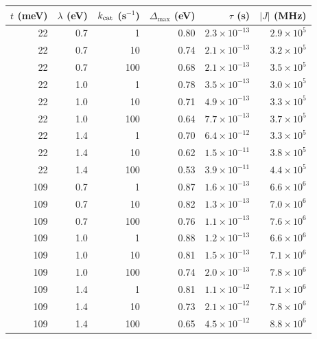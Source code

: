 \begin{tabular}{rrrrrr}
\toprule
$t$ (meV) & $\lambda$ (eV) & $k_{\rm cat}$ (s$^{-1}$) & $\Delta_{\max}$ (eV) & $\tau$ (s) & $|J|$ (MHz) \\
\midrule
22 & 0.7 & 1 & 0.80 & $\ensuremath{2.3\times10^{-13}}$ & $\ensuremath{2.9\times10^{5}}$ \\
22 & 0.7 & 10 & 0.74 & $\ensuremath{2.1\times10^{-13}}$ & $\ensuremath{3.2\times10^{5}}$ \\
22 & 0.7 & 100 & 0.68 & $\ensuremath{2.1\times10^{-13}}$ & $\ensuremath{3.5\times10^{5}}$ \\
22 & 1.0 & 1 & 0.78 & $\ensuremath{3.5\times10^{-13}}$ & $\ensuremath{3.0\times10^{5}}$ \\
22 & 1.0 & 10 & 0.71 & $\ensuremath{4.9\times10^{-13}}$ & $\ensuremath{3.3\times10^{5}}$ \\
22 & 1.0 & 100 & 0.64 & $\ensuremath{7.7\times10^{-13}}$ & $\ensuremath{3.7\times10^{5}}$ \\
22 & 1.4 & 1 & 0.70 & $\ensuremath{6.4\times10^{-12}}$ & $\ensuremath{3.3\times10^{5}}$ \\
22 & 1.4 & 10 & 0.62 & $\ensuremath{1.5\times10^{-11}}$ & $\ensuremath{3.8\times10^{5}}$ \\
22 & 1.4 & 100 & 0.53 & $\ensuremath{3.9\times10^{-11}}$ & $\ensuremath{4.4\times10^{5}}$ \\
109 & 0.7 & 1 & 0.87 & $\ensuremath{1.6\times10^{-13}}$ & $\ensuremath{6.6\times10^{6}}$ \\
109 & 0.7 & 10 & 0.82 & $\ensuremath{1.3\times10^{-13}}$ & $\ensuremath{7.0\times10^{6}}$ \\
109 & 0.7 & 100 & 0.76 & $\ensuremath{1.1\times10^{-13}}$ & $\ensuremath{7.6\times10^{6}}$ \\
109 & 1.0 & 1 & 0.88 & $\ensuremath{1.2\times10^{-13}}$ & $\ensuremath{6.6\times10^{6}}$ \\
109 & 1.0 & 10 & 0.81 & $\ensuremath{1.5\times10^{-13}}$ & $\ensuremath{7.1\times10^{6}}$ \\
109 & 1.0 & 100 & 0.74 & $\ensuremath{2.0\times10^{-13}}$ & $\ensuremath{7.8\times10^{6}}$ \\
109 & 1.4 & 1 & 0.81 & $\ensuremath{1.1\times10^{-12}}$ & $\ensuremath{7.1\times10^{6}}$ \\
109 & 1.4 & 10 & 0.73 & $\ensuremath{2.1\times10^{-12}}$ & $\ensuremath{7.8\times10^{6}}$ \\
109 & 1.4 & 100 & 0.65 & $\ensuremath{4.5\times10^{-12}}$ & $\ensuremath{8.8\times10^{6}}$ \\

\end{tabular}

